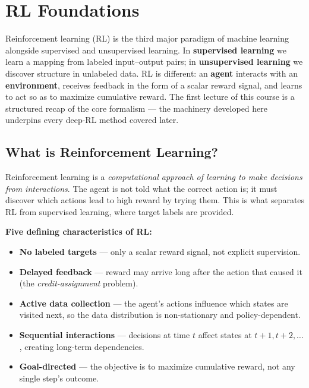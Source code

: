 \documentclass[11pt, oneside]{book}
\begin{document}
\setcounter{tocdepth}{2}  %

\begingroup
  \let\cleardoublepage\relax
  \let\clearpage\relax
  \tableofcontents
\endgroup

\mainmatter  %


\chapter{RL Foundations}

Reinforcement learning (RL) is the third major paradigm of machine learning alongside
supervised and unsupervised learning.
In \textbf{supervised learning} we learn a mapping from labeled input--output pairs;
in \textbf{unsupervised learning} we discover structure in unlabeled data.
RL is different: an \textbf{agent} interacts with an \textbf{environment}, receives
feedback in the form of a scalar reward signal, and learns to act so as to maximize
cumulative reward.
The first lecture of this course is a structured recap of the core formalism ---
the machinery developed here underpins every deep-RL method covered later.

\section{What is Reinforcement Learning?}

Reinforcement learning is a \emph{computational approach of learning to make decisions
from interactions}.
The agent is not told what the correct action is; it must discover which actions lead
to high reward by trying them.
This is what separates RL from supervised learning, where target labels are provided.

\begin{intbox}
\textbf{Five defining characteristics of RL:}
\begin{itemize}
  \item \textbf{No labeled targets} --- only a scalar reward signal, not explicit
    supervision.
  \item \textbf{Delayed feedback} --- reward may arrive long after the action that
    caused it (the \emph{credit-assignment} problem).
  \item \textbf{Active data collection} --- the agent's actions influence which states
    are visited next, so the data distribution is non-stationary and policy-dependent.
  \item \textbf{Sequential interactions} --- decisions at time $t$ affect states at
    $t+1, t+2, \dots$, creating long-term dependencies.
  \item \textbf{Goal-directed} --- the objective is to maximize cumulative reward, not
    any single step's outcome.
\end{itemize}
\end{intbox}
\end{document}
